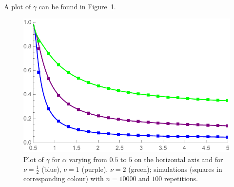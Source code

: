 \begin{theorem}
\end{theorem}

\noindent
A plot of $\gamma$ can be found in Figure~\ref{fig:gamma}.


\begin{figure}[h!]
    \centering
    \includegraphics[scale=0.6]{figures/cn10000nu0512rep100a05to5Squares.pdf}
    \caption{Plot of $\gamma$ for $\alpha$ varying from $0.5$ to $5$ on the horizontal axis and 
    for $\nu=\frac{1}{2}$ (blue), $\nu=1$ (purple), $\nu=2$ (green); simulations (squares in corresponding colour) with $n=10000$ and $100$ repetitions.\label{fig:gamma}}
\end{figure}

